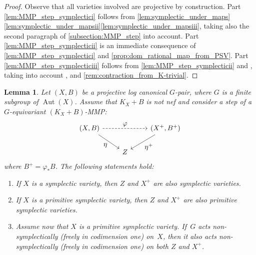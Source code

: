 \documentclass[JEP,XML,SOM,Unicode,published]{cedram}
\let\ts\textstyle
\theoremstyle{plain}
\newtheorem{lem}[thm]{Lemma}
\theoremstyle{definition}
\DeclareMathOperator{\Aut}{Aut}
\begin{document}
\begin{proof}
Observe that all varieties involved are projective by construction. Part \eqref{lem:MMP_step_symplectici} follows from \autoref{lem:symplectic_under_maps}\eqref{lem:symplectic_under_mapsii}\eqref{lem:symplectic_under_mapsiii}, taking also the second paragraph of \autoref{subsection:MMP_step} into account. Part \eqref{lem:MMP_step_symplecticii} is an immediate consequence of \eqref{lem:MMP_step_symplectici} and \autoref{prop:dom_rational_map_from_PSV}. Part \eqref{lem:MMP_step_symplecticiii} follows from \eqref{lem:MMP_step_symplecticii} and \cite[Cor.\,1]{Nam06}, taking into account \cite[Lem.\,3.38]{KM98}, \cite[Prop.\,4.8.20]{Fuj17book} and \autoref{rem:contraction_from_K-trivial}.
\end{proof}

\begin{lem}
\label{lem:G-equivariant_MMP_step_symplectic}
Let $(X,B)$ be a projective log canonical $G$\nobreakdash-pair, where $G$ is a finite subgroup of $\Aut(X)$. Assume that $K_X+B$ is not nef and consider a step of a $G$\nobreakdash-equiva\-riant $(K_X+B)$-MMP:
\[
\begin{tikzcd}
(X, B) \arrow[dr, "\ts \eta" swap] \arrow[rr, "\ts \varphi", dashed] && (X^+, B^+) \arrow[dl, "\ts \eta^+"] \\
& Z
\end{tikzcd}
\]
where $B^+ = \varphi_* B$. The following statements hold:
\begin{enumerate}
\item\label{lem:G-equivariant_MMP_step_symplectici}
If $X$ is a symplectic variety, then $Z$ and $X^+$ are also symplectic varieties.

\item\label{lem:G-equivariant_MMP_step_symplecticii}
If $X$ is a primitive symplectic variety, then $Z$ and $X^+$ are also primitive symplectic varieties.

\item\label{lem:G-equivariant_MMP_step_symplecticiii}
Assume now that $X$ is a primitive symplectic variety. If~$G$ acts non-symplecti\-cally (\resp freely in codimension one) on~$X$, then it also acts non-symplectically (\resp freely in codimension one) on both $Z$ and $X^+$.
\end{enumerate}
\end{lem}
\end{document}
